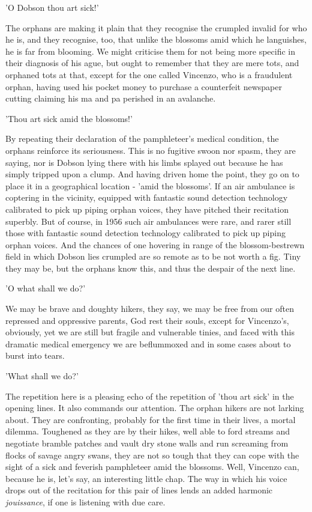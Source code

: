'O Dobson thou art sick!'

The orphans are making it plain that they recognise the crumpled invalid for who he is, and they recognise, too, that unlike the blossoms amid which he languishes, he is far from blooming. We might criticise them for not being more specific in their diagnosis of his ague, but ought to remember that they are mere tots, and orphaned tots at that, except for the one called Vincenzo, who is a fraudulent orphan, having used his pocket money to purchase a counterfeit newspaper cutting claiming his ma and pa perished in an avalanche.

'Thou art sick amid the blossoms!'

By repeating their declaration of the pamphleteer's medical condition, the orphans reinforce its seriousness. This is no fugitive swoon nor spasm, they are saying, nor is Dobson lying there with his limbs splayed out because he has simply tripped upon a clump. And having driven home the point, they go on to place it in a geographical location - 'amid the blossoms'. If an air ambulance is coptering in the vicinity, equipped with fantastic sound detection technology calibrated to pick up piping orphan voices, they have pitched their recitation superbly. But of course, in 1956 such air ambulances were rare, and rarer still those with fantastic sound detection technology calibrated to pick up piping orphan voices. And the chances of one hovering in range of the blossom-bestrewn field in which Dobson lies crumpled are so remote as to be not worth a fig. Tiny they may be, but the orphans know this, and thus the despair of the next line.

'O what shall we do?'


We may be brave and doughty hikers, they say, we may be free from our often repressed and oppressive parents, God rest their souls, except for Vincenzo's, obviously, yet we are still but fragile and vulnerable tinies, and faced with this dramatic medical emergency we are beflummoxed and in some cases about to burst into tears.

'What shall we do?'


The repetition here is a pleasing echo of the repetition of 'thou art sick' in the opening lines. It also commands our attention. The orphan hikers are not larking about. They are confronting, probably for the first time in their lives, a mortal dilemma. Toughened as they are by their hikes, well able to ford streams and negotiate bramble patches and vault dry stone walls and run screaming from flocks of savage angry swans, they are not so tough that they can cope with the sight of a sick and feverish pamphleteer amid the blossoms. Well, Vincenzo can, because he is, let's say, an interesting little chap. The way in which his voice drops out of the recitation for this pair of lines lends an added harmonic \emph{jouissance}, if one is listening with due care.

